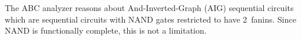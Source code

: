 The ABC analyzer reasons about And-Inverted-Graph (AIG)
sequential circuits which are
sequential circuits with NAND gates restricted to have 2~fanins.
Since NAND is functionally complete, this is not a limitation.  

\begin{comment}
\subsection{Illustrating sequential circuits with C++ 
    classes}
\label{sec:back:crct_cpp}

An alternative way to understand a sequential circuit is
to think of it as a set of communicating and concurrent
threads.  A sequential circuit is easily understood as a
concurrent C program with Boolean variables describing 
its states, and functions describing its output and
computation.

\begin{lstlisting}
Boolean registerVariables[];
Boolean done;
  
void initialState(Boolean inputs[]);
Boolean nextState(Boolean inputs[]);
Boolean outputFunction(Boolean inputs[]);

Boolean executeCircuit(Boolean inputs[]) {
  initialState(inputs);
  while(!done) {
    for (int i = 0; i < sizeofRegisterVariables; i++) 
      dotogether {
        registerVariables[i] = nextState(registerVariables, inputs); 
      }
    return outputFunction(registerVariables, inputs); 
  } 
} 
\end{lstlisting}

The register variables describe the state of the program along with the \cci{done} 
variable that denotes the completion of the computation.  
The sequential circuit also accepts primary input variables as parameters to its functions. 

The \cci{initialState} function assigns the initial
state of the sequential circuit by assigning values to its
register variables that are restricted to be combinational
functions of the \cci{inputs}.  The \cci{nextState}
function updates the state of the sequential circuit by
assigning values to the register variables that are
combinational functions of the \cci{inputs} and the
\cci{registerVariables} themselves.  The \cci{nextState} 
function performs the computational function of
the sequential circuit and assigns \cci{done} to a
$\mbox{true}$ value once it completes the computation.
The \cci{outputFunction} returns the result of the
computation. 

Note that a sequential circuit may have more than one
output function where some of these functions denote the
validity of the output.  The function
\cci{executeCircuit} calls the \cci{initialState}
function to initialize it and then calling
\cci{nextState} to perform the computation.  It then
returns the output of the computation via calling the
\cci{outputFunction}.  The \cci{while} in
\cci{executeCircuit} models time where each iteration
is a step. 
\end{comment}
